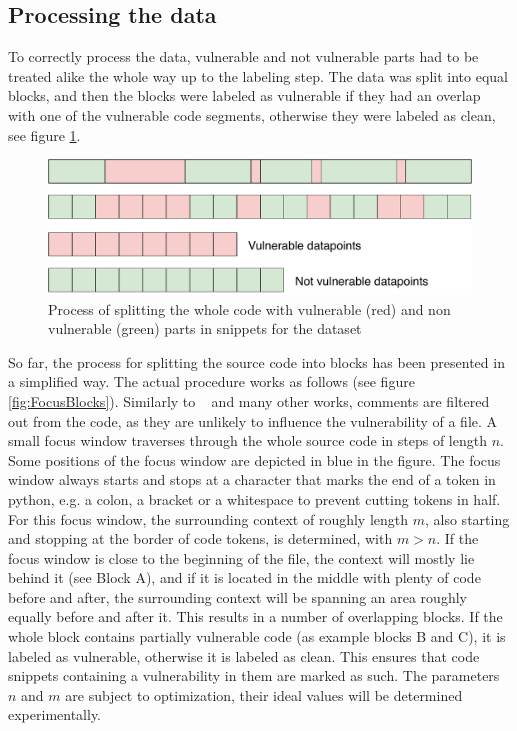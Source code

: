\documentclass[
	a4paper,
	pagesize,
	pdftex,
	12pt,
	twoside, %
	BCOR=5mm, %
	ngerman,
	fleqn,
	final,
	]{scrartcl}
\begin{document}
\subsection{Processing the data}\label{Processing}
To correctly process the data, vulnerable and not vulnerable parts had to be treated alike the whole way up to the labeling step. The data was split into equal blocks, and then the blocks were labeled as vulnerable if they had an overlap with one of the vulnerable code segments, otherwise they were labeled as clean, see figure \ref{fig:collectData2}.

\begin{figure}[ht]
	\centering
	\includegraphics[width=\linewidth]{img/collectData2}
	\caption{Process of splitting the whole code with vulnerable (red) and non vulnerable (green) parts in snippets for the dataset}
	\label{fig:collectData2}
\end{figure}

So far, the process for splitting the source code into blocks has been presented in a simplified way. The actual procedure works as follows (see figure \ref{fig:FocusBlocks}).
Similarly to ~\cite{Hovsepyan.2012} and many other works, comments are filtered out from the code, as they are unlikely to influence the vulnerability of a file. A small focus window traverses through the whole source code in steps of length $n$. Some positions of the focus window are depicted in blue in the figure. The focus window always starts and stops at a character that marks the end of a token in python, e.g. a colon, a bracket or a whitespace to prevent cutting tokens in half. For this focus window, the surrounding context of roughly length $m$, also starting and stopping at the border of code tokens, is determined, with $m > n$. If the focus window is close to the beginning of the file, the context will mostly lie behind it (see Block A), and if it is located in the middle with plenty of code before and after, the surrounding context will be spanning an area roughly equally before and after it. This results in a number of overlapping blocks. If the whole block contains partially vulnerable code (as example blocks B and C), it is labeled as vulnerable, otherwise it is labeled as clean. This ensures that code snippets containing a vulnerability in them are marked as such. The parameters $n$ and $m$ are subject to optimization, their ideal values will be determined experimentally.
\end{document}
